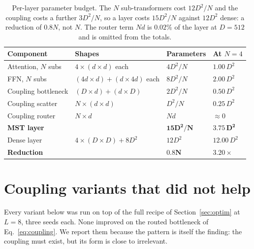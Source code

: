 \documentclass{article}
\newcommand{\dmodel}{D}
\newcommand{\dsub}{d}
\newcommand{\nsub}{N}
\begin{document}
\begin{table}[h]
\caption{Per-layer parameter budget. The $\nsub$ sub-transformers cost $12\dmodel^2/\nsub$
and the coupling costs a further $3\dmodel^2/\nsub$, so a layer costs $15\dmodel^2/\nsub$
against $12\dmodel^2$ dense: a reduction of $0.8\nsub$, not $\nsub$. The router term
$\nsub\dsub$ is $0.02\%$ of the layer at $\dmodel{=}512$ and is omitted from the totals.}
\label{tab:budget}
\begin{center}
\begin{small}
\begin{tabular}{llll}
\toprule
Component & Shapes & Parameters & At $\nsub{=}4$ \\
\midrule
Attention, $\nsub$ subs & $4\times(\dsub\!\times\!\dsub)$ each & $4\dmodel^2/\nsub$ & $1.00\,\dmodel^2$ \\
FFN, $\nsub$ subs       & $(4\dsub\!\times\!\dsub)+(\dsub\!\times\!4\dsub)$ each & $8\dmodel^2/\nsub$ & $2.00\,\dmodel^2$ \\
Coupling bottleneck     & $(\dmodel\!\times\!\dsub)+(\dsub\!\times\!\dmodel)$ & $2\dmodel^2/\nsub$ & $0.50\,\dmodel^2$ \\
Coupling scatter        & $\nsub\times(\dsub\!\times\!\dsub)$ & $\dmodel^2/\nsub$ & $0.25\,\dmodel^2$ \\
Coupling router         & $\nsub\!\times\!\dsub$ & $\nsub\dsub$ & $\approx 0$ \\
\midrule
\textbf{MST layer}      &  & $\mathbf{15\dmodel^2/\nsub}$ & $\mathbf{3.75\,\dmodel^2}$ \\
Dense layer             & $4\times(\dmodel\!\times\!\dmodel) + 8\dmodel^2$ & $12\dmodel^2$ & $12.00\,\dmodel^2$ \\
\midrule
\textbf{Reduction}      &  & $\mathbf{0.8\nsub}$ & $\mathbf{3.20\times}$ \\
\bottomrule
\end{tabular}
\end{small}
\end{center}
\end{table}

\section{Coupling variants that did not help}
\label{app:negative}

Every variant below was run on top of the full recipe of
Section~\ref{sec:optim} at $L{=}8$, three seeds each. None improved on the
routed bottleneck of Eq.~\ref{eq:coupling}. We report them because the pattern is
itself the finding: the coupling must exist, but its form is close to irrelevant.
\end{document}
